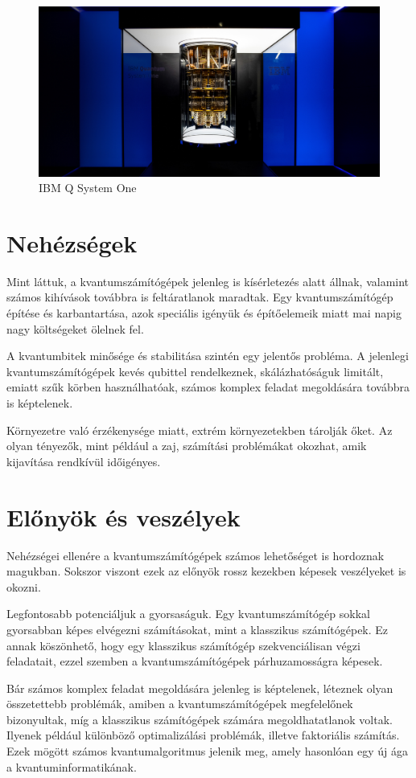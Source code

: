 \documentclass[
]{thesis-ekf}
\theoremstyle{definition}
\theoremstyle{remark}
\begin{document}
\begin{figure}[H]
	\centering
	\includegraphics[width=0.7\linewidth]{SystemOne}
	\caption{IBM Q System One}
	\label{fig:systemone}
\end{figure}


\section{Nehézségek}
Mint láttuk, a kvantumszámítógépek jelenleg is kísérletezés alatt állnak, valamint számos kihívások továbbra is feltáratlanok maradtak. Egy kvantumszámítógép építése és karbantartása, azok speciális igényük és építőelemeik miatt mai napig nagy költségeket ölelnek fel.

A kvantumbitek minősége és stabilitása szintén egy jelentős probléma. A jelenlegi kvantumszámítógépek kevés qubittel rendelkeznek, skálázhatóságuk limitált, emiatt szűk körben használhatóak, számos komplex feladat megoldására továbbra is képtelenek.\cite{BiróKoczkaPrantner}

Környezetre való érzékenysége miatt, extrém környezetekben tárolják őket. Az olyan tényezők, mint például a zaj, számítási problémákat okozhat, amik kijavítása rendkívül időigényes.

\section{Előnyök és veszélyek}
Nehézségei ellenére a kvantumszámítógépek számos lehetőséget is hordoznak magukban. Sokszor viszont ezek az előnyök rossz kezekben képesek veszélyeket is okozni.

Legfontosabb potenciáljuk a gyorsaságuk. Egy kvantumszámítógép sokkal gyorsabban képes elvégezni számításokat, mint a klasszikus számítógépek. Ez annak köszönhető, hogy egy klasszikus számítógép szekvenciálisan végzi feladatait, ezzel szemben a kvantumszámítógépek párhuzamosságra képesek.

Bár számos komplex feladat megoldására jelenleg is képtelenek, léteznek olyan összetettebb problémák, amiben a kvantumszámítógépek megfelelőnek bizonyultak, míg a klasszikus számítógépek számára megoldhatatlanok voltak. Ilyenek például különböző optimalizálási problémák, illetve faktoriális számítás. Ezek mögött számos kvantumalgoritmus jelenik meg, amely hasonlóan egy új ága a kvantuminformatikának.\cite{WikipediaQcomuputer}
\end{document}
